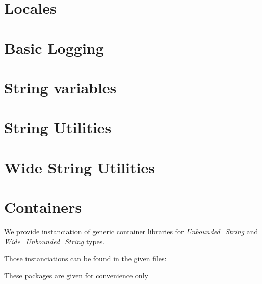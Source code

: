 \documentclass[english,letterpaper]{book}
\begin{document}
\section{Locales}
\label{api:locales}


\section{Basic Logging}
\label{api:log}

\section{String variables}
\label{api:replacer}

\section{String Utilities}
\label{api:string_util}

\section{Wide String Utilities}
\label{api:wide_string_util}

\section{Containers}
\label{api:containers}

We provide instanciation of generic container libraries for \emph{Unbounded\_String} and \emph{Wide\_Unbounded\_String} types.

Those instanciations can be found in the given files:












These packages are given for convenience only
\end{document}
